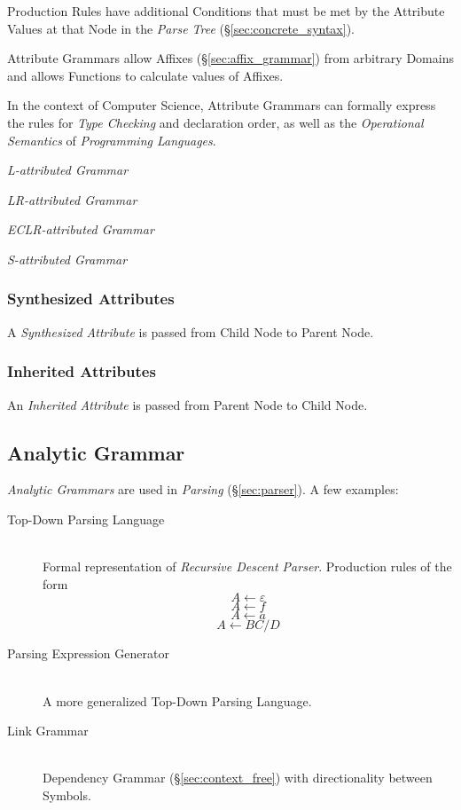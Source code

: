 Production Rules have additional Conditions that must be met by the
Attribute Values at that Node in the \emph{Parse Tree}
(\S\ref{sec:concrete_syntax}).

Attribute Grammars allow Affixes (\S\ref{sec:affix_grammar}) from
arbitrary Domains and allows Functions to calculate values of Affixes.

In the context of Computer Science, Attribute Grammars can formally
express the rules for \emph{Type Checking} and declaration order, as
well as the \emph{Operational Semantics} of \emph{Programming
  Languages}.

\emph{L-attributed Grammar}

\emph{LR-attributed Grammar}

\emph{ECLR-attributed Grammar}

\emph{S-attributed Grammar}



\subsubsection{Synthesized Attributes}

A \emph{Synthesized Attribute} is passed from Child Node to Parent
Node.



\subsubsection{Inherited Attributes}

An \emph{Inherited Attribute} is passed from Parent Node to Child
Node.



\subsection{Analytic Grammar}\label{sec:analytic_grammar}

\emph{Analytic Grammars} are used in \emph{Parsing}
(\S\ref{sec:parser}). A few examples:

\begin{description}
\item[Top-Down Parsing Language] \hfill \\
Formal representation of \emph{Recursive Descent Parser}. Production
rules of the form
\[
    A \leftarrow \varepsilon
\]\[
    A \leftarrow f
\]\[
    A \leftarrow a
\]\[
    A \leftarrow BC/D
\]
\item[Parsing Expression Generator] \hfill \\
A more generalized Top-Down Parsing Language.
\item[Link Grammar] \hfill \\
Dependency Grammar
  (\S\ref{sec:context_free}) with directionality between Symbols.
\end{description}



